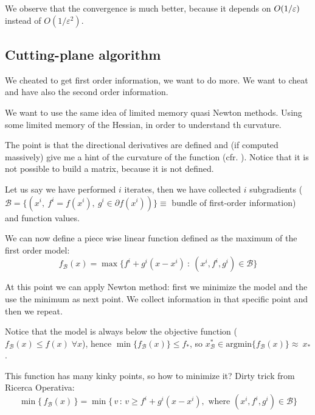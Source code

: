 \documentclass[computational_mathematics.tex]{subfiles}
\begin{document}
We observe that the convergence is much better, because it depends on $O(1 / \varepsilon)$ instead of $O(1/\varepsilon^2)$.


\subsection{Cutting-plane algorithm}
We cheated to get first order information, we want to do more. We want to cheat and have also the second order information.

We want to use the same idea of limited memory quasi Newton methods. Using some limited memory of the Hessian, in order to understand th curvature.

The point is that the directional derivatives are defined and (if computed massively) give me a hint of the curvature of the function (cfr. ).
Notice that it is not possible to build a matrix, because it is not defined.


Let us say we have performed $i$ iterates, then we have collected $i$ subgradients ($\mathscr{B} = \{(x^i,~f^i = f(x^i),~g^i \in \partial f(x^i))\} \equiv$ bundle of first-order information) and function values.

We can now define a piece wise linear function defined as the maximum of the first order model:
\[
  f_{\mathscr{B}}(x) = \max \{f^i + g^i (x - x^i)~:~(x^i, f^i, g^i) \in \mathscr{B}\}
\]

At this point we can apply Newton method: first we minimize the model and the use the minimum as next point. We collect information in that specific point and then we repeat.

 Notice that the model is always below the objective function ($f_{\mathscr{B}}(x) \leq f(x) \; \forall x$), hence $\min \{f_{\mathscr{B}}(x)\} \leq f_*$, so $x^*_{\mathscr{B}} \in \mbox{argmin} \{f_{\mathscr{B}}(x) \} \approx~x_*$.

 This function has many kinky points, so how to minimize it?
Dirty trick from Ricerca Operativa: 
\[
  \min \{ \, f_{\mathscr{B}}(x) \, \} = \min \{ \, v \,:\, v \geq f^i + g^i (x - x^i),\text{ where } (x^i,f^i,g^i) \in \mathscr{B}\}
\]
\end{document}
